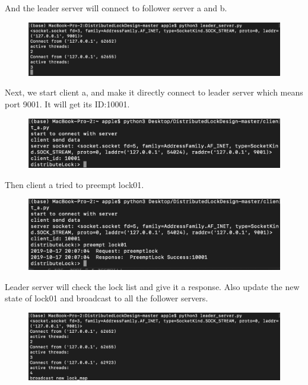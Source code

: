 \documentclass[10pt]{article}
\begin{document}
And the leader server will connect to follower server a and b.

\begin{figure}[H]
\centerline{\includegraphics[width = 1\textwidth]{screenshot//leader_02.png}}
\end{figure}

Next, we start client a, and make it directly connect to leader server which means port 9001. It will get its ID:10001.

\begin{figure}[H]
\centerline{\includegraphics[width = 1\textwidth]{screenshot//client_01.png}}
\end{figure}

Then client a tried to preempt lock01.

\begin{figure}[H]
\centerline{\includegraphics[width = 1\textwidth]{screenshot//client_02.png}}
\end{figure}

Leader server will check the lock list and give it a response. Also update the new state of lock01 and broadcast to all the follower servers.

\begin{figure}[H]
\centerline{\includegraphics[width = 1\textwidth]{screenshot//leader_03.png}}
\end{figure}
\end{document}
